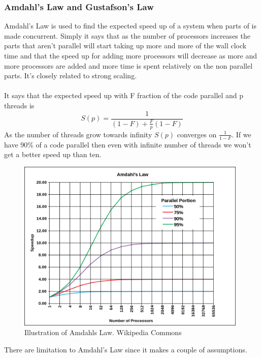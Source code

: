 \documentclass[10pt,a4paper]{report}
\begin{document}
\subsubsection{Amdahl's Law and Gustafson's Law}
Amdahl's Law is used to find the expected speed up of a system when parts of is made concurrent. Simply it says that as the number of processors increases the parts that aren't parallel will start taking up more and more of the wall clock time and that the speed up for adding more processors will decrease as more and more processors are added and more time is spent relatively on the non parallel parts\cite{introduction_hpc_hager}. It's closely related to strong scaling.\cite{cuda_best_practice,2010_reevaluating_amdahl}\\
\\
It says that the expected speed up with F fraction of the code parallel and p threads is\cite{introduction_hpc_hager} 
$$S(p)=\frac{1}{(1-F)+\frac{F}{p}(1-F)}$$
As the number of threads grow towards infinity $S(p)$ converges on $\frac{1}{1-F}$. If we have 90\% of a code parallel then even with infinite number of threads we won't get a better speed up than ten.\cite{2010_reevaluating_amdahl}

\begin{figure}[h]
    \centering
    \includegraphics[width=11cm]{AmdahlsLaw.png}
    \caption{Illustration of Amdahls Law. Wikipedia Commons}
    \label{fig:AmdahlsLaw}
\end{figure}

There are limitation to Amdahl's Law since it makes a couple of assumptions.
\end{document}

